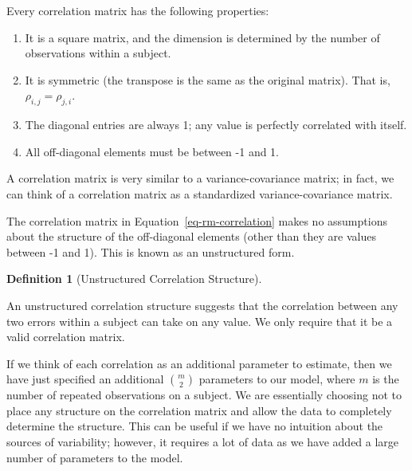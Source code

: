 \documentclass[
  letterpaper,
  DIV=11,
  numbers=noendperiod]{scrreprt}
\providecommand{\tightlist}{%
  \setlength{\itemsep}{0pt}\setlength{\parskip}{0pt}}\usepackage{longtable,booktabs,array}
\theoremstyle{definition}
\theoremstyle{definition}
\newtheorem{definition}{Definition}[chapter]
\theoremstyle{remark}
\begin{document}
\begin{tcolorbox}[enhanced jigsaw, bottomrule=.15mm, titlerule=0mm, bottomtitle=1mm, colback=white, coltitle=black, rightrule=.15mm, leftrule=.75mm, toprule=.15mm, toptitle=1mm, left=2mm, opacityback=0, colframe=quarto-callout-note-color-frame, breakable, title=\textcolor{quarto-callout-note-color}{\faInfo}\hspace{0.5em}{Properties of Correlation Matrices}, arc=.35mm, colbacktitle=quarto-callout-note-color!10!white, opacitybacktitle=0.6]

Every correlation matrix has the following properties:

\begin{enumerate}
\def\labelenumi{\arabic{enumi}.}
\tightlist
\item
  It is a square matrix, and the dimension is determined by the number
  of observations within a subject.
\item
  It is symmetric (the transpose is the same as the original matrix).
  That is, \(\rho_{i,j} = \rho_{j,i}\).
\item
  The diagonal entries are always 1; any value is perfectly correlated
  with itself.
\item
  All off-diagonal elements must be between -1 and 1.
\end{enumerate}

\end{tcolorbox}

A correlation matrix is very similar to a variance-covariance matrix; in
fact, we can think of a correlation matrix as a standardized
variance-covariance matrix.

The correlation matrix in Equation~\ref{eq-rm-correlation} makes no
assumptions about the structure of the off-diagonal elements (other than
they are values between -1 and 1). This is known as an unstructured
form.

\begin{definition}[Unstructured Correlation
Structure]\protect\hypertarget{def-unstructured-correlation-structure}{}\label{def-unstructured-correlation-structure}

An unstructured correlation structure suggests that the correlation
between any two errors within a subject can take on any value. We only
require that it be a valid correlation matrix.

\end{definition}

If we think of each correlation as an additional parameter to estimate,
then we have just specified an additional \(\binom{m}{2}\) parameters to
our model, where \(m\) is the number of repeated observations on a
subject. We are essentially choosing not to place any structure on the
correlation matrix and allow the data to completely determine the
structure. This can be useful if we have no intuition about the sources
of variability; however, it requires a lot of data as we have added a
large number of parameters to the model.
\end{document}
